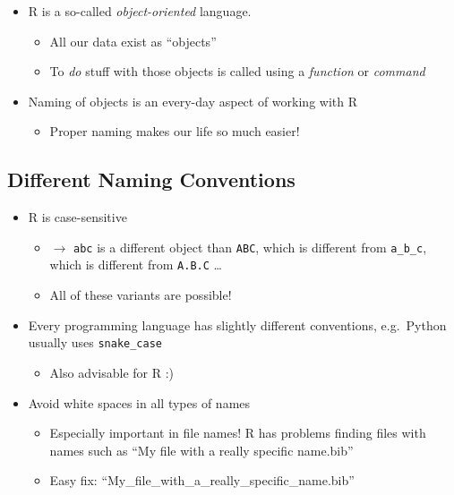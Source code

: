 \documentclass[
]{book}
\providecommand{\tightlist}{%
  \setlength{\itemsep}{0pt}\setlength{\parskip}{0pt}}
\begin{document}
\begin{itemize}
\tightlist
\item
  R is a so-called \emph{object-oriented} language.

  \begin{itemize}
  \tightlist
  \item
    All our data exist as ``objects''
  \item
    To \emph{do} stuff with those objects is called using a \emph{function} or \emph{command}
  \end{itemize}
\item
  Naming of objects is an every-day aspect of working with R

  \begin{itemize}
  \tightlist
  \item
    Proper naming makes our life so much easier!
  \end{itemize}
\end{itemize}

\subsection{Different Naming Conventions}\label{different-naming-conventions}

\begin{itemize}
\tightlist
\item
  R is case-sensitive

  \begin{itemize}
  \tightlist
  \item
    \(\rightarrow\) \texttt{abc} is a different object than \texttt{ABC}, which is different from \texttt{a\_b\_c}, which is different from \texttt{A.B.C} \ldots{}
  \item
    All of these variants are possible!
  \end{itemize}
\item
  Every programming language has slightly different conventions, e.g.~Python usually uses \texttt{snake\_case}

  \begin{itemize}
  \tightlist
  \item
    Also advisable for R :)
  \end{itemize}
\item
  Avoid white spaces in all types of names

  \begin{itemize}
  \tightlist
  \item
    Especially important in file names! R has problems finding files with names such as ``My file with a really specific name.bib''
  \item
    Easy fix: ``My\_file\_with\_a\_really\_specific\_name.bib''
  \end{itemize}
\end{itemize}
\end{document}
